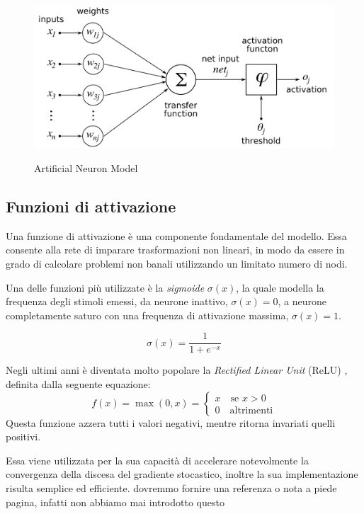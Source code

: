 \begin{figure}[htb]
	\centering
	{\includegraphics[width=.7\textwidth]{images/ArtificialNeuronModel}} 
	\caption{Artificial Neuron Model}
	\label{fig:Modello matematico di un neurone artificiale}
\end{figure}

\subsection{Funzioni di attivazione}
\label{subsec:fattivazione}
Una funzione di attivazione è una componente fondamentale del modello. Essa consente alla rete di imparare trasformazioni non lineari, in modo da essere in grado di calcolare problemi non banali utilizzando un limitato numero di nodi.

Una delle funzioni più utilizzate è la \emph{sigmoide} $\sigma(x)$, la quale modella la frequenza degli stimoli emessi, da neurone inattivo, $\sigma(x)=0$, a neurone completamente saturo con una frequenza di attivazione massima, $\sigma(x)=1$.

\begin{equation}
\sigma(x) = \frac{1}{1+e^{-x}}
\label{eq:sigmoid}
\end{equation}


Negli ultimi anni è diventata molto popolare la \emph{Rectified Linear Unit} (ReLU) \cite{nair2010rectified,hahnloser2000digital,hahnloser2003permitted,glorot2011deepsparse}, definita dalla seguente equazione:
\begin{equation}
f (x) = \max(0, x)= \begin{cases}
x \quad \mbox{se } x>0\\
0 \quad \mbox{altrimenti}
\end{cases}
\label{eq:relu}
\end{equation}
Questa funzione azzera tutti i valori negativi, mentre ritorna invariati quelli positivi.

Essa viene utilizzata per la sua capacità di accelerare notevolmente la convergenza della discesa del gradiente stocastico, inoltre la sua implementazione risulta semplice ed efficiente. {\color{red}dovremmo fornire una referenza o nota a piede pagina, infatti non abbiamo mai introdotto questo}

